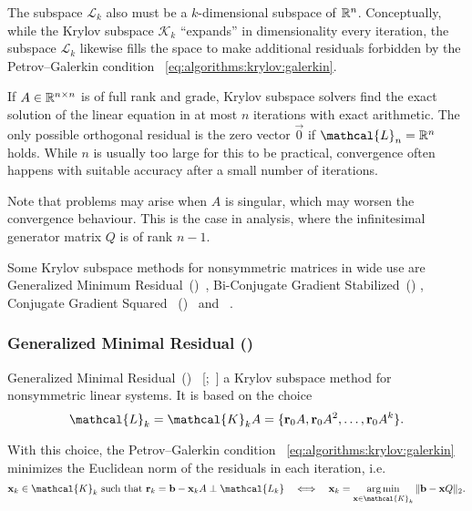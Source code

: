 The subspace $\mathcal{L}_k$ also must be a $k$-dimensional subspace
of $\mathbb{R}^n$. Conceptually, while the Krylov subspace $\mathcal{K}_k$
``expands'' in dimensionality every iteration, the subspace
$\mathcal{L}_k$ likewise fills the space to make additional residuals
forbidden by the Petrov--Galerkin condition~%
\eqref{eq:algorithms:krylov:galerkin}.

If $A \in \mathbb{R}^{n \times n}$ is of full rank and grade, Krylov subspace
solvers find the exact solution of the linear equation in at most $n$
iterations with exact arithmetic. The only possible orthogonal
residual is the zero vector $\vec{0}$ if $\mathcal{L}_n = \RR^n$
holds. While $n$ is usually too large for this to be practical,
convergence often happens with suitable accuracy after a small number
of iterations.

Note that problems may arise when $A$ is singular, which may worsen
the convergence behaviour. This is the case in  analysis,
where the infinitesimal generator matrix $Q$ is of rank $n - 1$.

Some Krylov subspace methods for nonsymmetric matrices in wide use are
Generalized Minimum Residual~()~\citep{saad1986gmres},
Bi-Conjugate Gradient Stabilized~()
\citep{van1992bi}, Conjugate Gradient Squared%
~()~\citep{sonneveld1989cgs} and
~\citep{sonneveld2008idr}.

\subsubsection{Generalized Minimal Residual ()}
\label{ssec:algorithms:gmres}

Generalized Minimal Residual~()%
~\mkbibbrackets{;~}
a Krylov subspace method for nonsymmetric linear systems. It is based
on the choice
\begin{equation}
  \label{eq:algorithms:gmres:lspace}
  \mathcal{L}_k = \mathcal{K}_k A = \{ \vec{r}_0A, \vec{r}_0A^2,
  \ldots, \vec{r}_0 A^k \} \text.
\end{equation}

With this choice, the Petrov--Galerkin condition~%
\eqref{eq:algorithms:krylov:galerkin} minimizes the Euclidean norm of
the residuals in each iteration, i.e.
\begin{equation}
  \label{eq:algorithms:gmres:minres}
  \vec{x}_k \in \mathcal{K}_k \text{ such that } \vec{r}_k = \vec{b} - \vec{x}_k A \perp
  \mathcal{L_k} \quad\Longleftrightarrow\quad \vec{x}_k = \argmin_{\vec{x} \in
    \mathcal{K}_k} \| \vec{b} - \vec{x} Q \|_2 \text.
\end{equation}

